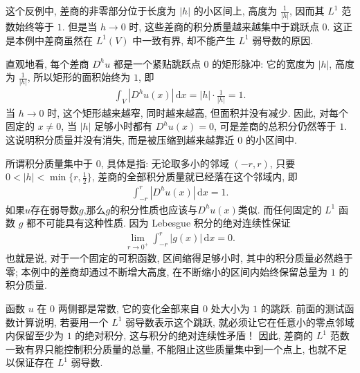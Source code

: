 \documentclass[../../main.tex]{subfiles}
\begin{document}
\begin{remark}
这个反例中, 差商的非零部分位于长度为 $|h|$ 的小区间上, 高度为 $\frac{1}{|h|}$, 因而其 $L^1$ 范数始终等于 $1$.
但是当 $h\to0$ 时, 这些差商的积分质量越来越集中于跳跃点 $0$.
这正是本例中差商虽然在 $L^1(V)$ 中一致有界, 却不能产生 $L^1$ 弱导数的原因.

直观地看, 每个差商 $D^h u$ 都是一个紧贴跳跃点 $0$ 的矩形脉冲: 它的宽度为 $|h|$, 高度为 $\frac{1}{|h|}$, 所以矩形的面积始终为 $1$, 即
\begin{align*}
\int_V|D^h u(x)|\,\mathrm{d}x
=|h|\cdot\frac{1}{|h|}
=1.
\end{align*}
当 $h\to0$ 时, 这个矩形越来越窄, 同时越来越高, 但面积并没有减少. 因此, 对每个固定的 $x\neq0$, 当 $|h|$ 足够小时都有 $D^h u(x)=0$, 可是差商的总积分仍然等于 $1$. 这说明积分质量并没有消失, 而是被压缩到越来越靠近 $0$ 的小区间中.

所谓积分质量集中于 $0$, 具体是指: 无论取多小的邻域 $(-r,r)$, 只要 $0<|h|<\min\{r,\frac{1}{2}\}$, 差商的全部积分质量就已经落在这个邻域内, 即
\begin{align*}
\int_{-r}^{r}|D^h u(x)|\,\mathrm{d}x=1.
\end{align*}
如果$u$存在弱导数$g$,那么$g$的积分性质也应该与$D^hu(x)$类似.
而任何固定的 $L^1$ 函数 $g$ 都不可能具有这种性质. 因为 Lebesgue 积分的绝对连续性保证
\begin{align*}
\lim\limits_{r\to 0^+}\int_{-r}^{r}|g(x)|\,\mathrm{d}x=0.
\end{align*}
也就是说, 对于一个固定的可积函数, 区间缩得足够小时, 其中的积分质量必然趋于零; 本例中的差商却通过不断增大高度, 在不断缩小的区间内始终保留总量为 $1$ 的积分质量.

函数 $u$ 在 $0$ 两侧都是常数, 它的变化全部来自 $0$ 处大小为 $1$ 的跳跃. 前面的测试函数计算说明, 若要用一个 $L^1$ 弱导数表示这个跳跃, 就必须让它在任意小的零点邻域内保留至少为 $1$ 的绝对积分, 这与积分的绝对连续性矛盾！ 因此, 差商的 $L^1$ 范数一致有界只能控制积分质量的总量, 不能阻止这些质量集中到一个点上, 也就不足以保证存在 $L^1$ 弱导数.
\end{remark}
\end{document}
